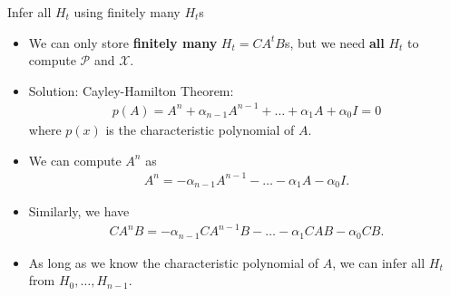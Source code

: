 \documentclass[10pt]{beamer}
\begin{document}
\begin{frame}{Infer all $H_t$ using finitely many $H_t$s}
  \begin{itemize}
  \item We can only store \textbf{finitely many} $H_t=CA^tB$s, but we need \textbf{all} $H_t$ to compute $\mathcal P$ and $\mathcal X$.
  \item Solution: Cayley-Hamilton Theorem: 
    \begin{align*}
      p(A) = A^n + \alpha_{n-1}A^{n-1}+\ldots+\alpha_1 A + \alpha_0 I = 0     
    \end{align*}
    where $p(x)$ is the characteristic polynomial of $A$. 
  \item We can compute $A^n$ as
    \begin{align*}
      A^n =- \alpha_{n-1}A^{n-1}-\ldots-\alpha_1 A - \alpha_0 I.
    \end{align*}
  \item Similarly, we have
    \begin{align*}
      CA^nB =- \alpha_{n-1}CA^{n-1}B-\ldots-\alpha_1 CAB - \alpha_0 CB.
    \end{align*}
\item As long as we know the characteristic polynomial of $A$, we can infer all $H_t$ from $H_0,\ldots, H_{n-1}$.
  \end{itemize} 
\end{frame}
\end{document}
